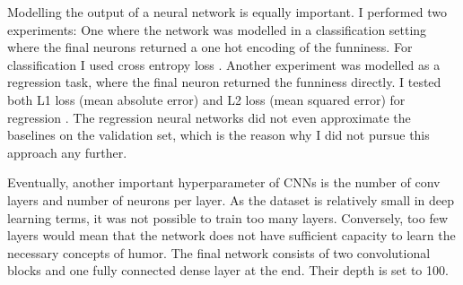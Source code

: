 \documentclass[draft,final,oneside]{vutinfth} %
\begin{document}
Modelling the output of a neural network is equally important. I performed two experiments: One where the network was modelled in a classification setting where the final neurons returned a one hot encoding of the funniness. For classification I used cross entropy loss \cite{crossentropyloss}. Another experiment was modelled as a  regression task, where the final neuron returned the funniness directly. I tested both L1 loss (mean absolute error) and L2 loss (mean squared error) for regression \cite{lossfunctions}. The regression neural networks did not even approximate the baselines on the validation set, which is the reason why I did not pursue this approach any further.

Eventually, another important hyperparameter of CNNs is the number of conv layers and number of neurons per layer. As the dataset is relatively small in deep learning terms, it was not possible to train too many layers. Conversely, too few layers would mean that the network does not have sufficient capacity to learn the necessary concepts of humor. The final network consists of two convolutional blocks and one fully connected dense layer at the end. Their depth is set to 100.
\end{document}

